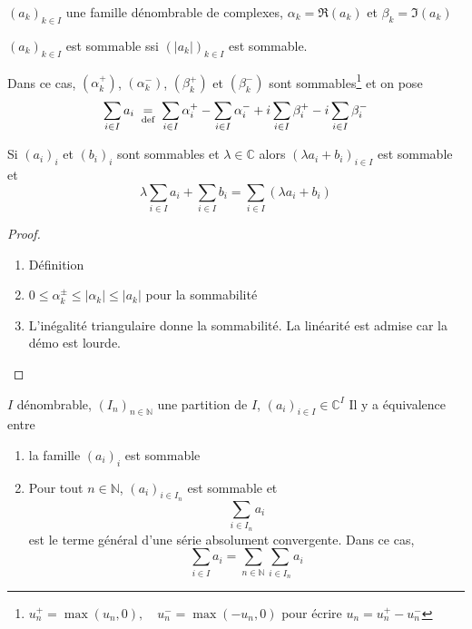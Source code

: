 \begin{defprop}
    \Hyp $(a_k)_{k\in I}$ une famille dénombrable de complexes, $\alpha_k=\Re(a_k)$ et $\beta_k=\Im(a_k)$
    \begin{concenum}
    \item $(a_k)_{k\in I}$ est sommable ssi $(|a_k|)_{k\in I}$ est sommable.
    \item Dans ce cas, $(\alpha_k^+)$, $(\alpha_k^-)$, $(\beta_k^+)$ et $(\beta_k^-)$ sont sommables\footnote{$u_n^+=\max(u_n, 0), \quad u_n^-=\max(-u_n, 0)$ pour écrire $u_n=u_n^+-u_n^-$} et on pose \[
            \sum_{i\in I}a_i\;\underset{\text{def}}=\;\sum_{i\in I}\alpha_i^+-\sum_{i\in I}\alpha_i^-+i\sum_{i\in I}\beta_i^+-i\sum_{i\in I}\beta_i^-
        \]
    \item Si $(a_i)_i$ et $(b_i)_i$ sont sommables et $\lambda\in\mathbb C$ alors $(\lambda a_i+b_i)_{i\in I}$ est sommable et \[
            \lambda\sum_{i\in I}a_i+\sum_{i\in I}b_i=\sum_{i\in I}(\lambda a_i+b_i)
        \]
    \end{concenum}
\end{defprop}

\begin{proof}~
    \begin{enumerate}
        \item Définition
        \item $0\leq \alpha_k^\pm\leq |\alpha_k|\leq |a_k|$ pour la sommabilité
        \item L'inégalité triangulaire donne la sommabilité. La linéarité est admise car la démo est lourde.
    \end{enumerate}
\end{proof}

\begin{thm}
    \Hyp $I$ dénombrable, $(I_n)_{n\in\mathbb N}$ une partition de $I$, $(a_i)_{i\in I}\in \mathbb C^I$
    \Conc Il y a équivalence entre \begin{enumerate}[left=1.1cm,label=\alph{enumi}.]
        \item la famille $(a_i)_i$ est sommable
        \item Pour tout $n\in\mathbb N$, $(a_i)_{i\in I_n}$ est sommable et \[
                \sum_{i\in I_n}a_i
            \]
            est le terme général d'une série absolument convergente. Dans ce cas, \[
                \sum_{i\in I}a_i=\sum_{n\in\mathbb N}\sum_{i\in I_n}a_i
            \]
    \end{enumerate}
\end{thm}

